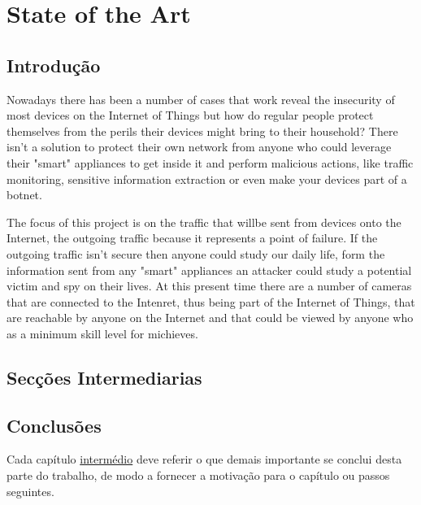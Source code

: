 \chapter{State of the Art}
\label{chap:estado-da-arte}

\section{Introdução}
\label{chap2:sec:intro}
Nowadays there has been a number of cases that work reveal the insecurity of
most devices on the Internet of Things
but how do regular people protect themselves from the perils their devices
might bring to their household? There isn't a solution to protect their own
network from anyone who could leverage their "smart" appliances to get inside
it and perform malicious actions, like traffic monitoring, sensitive
information extraction or even make your devices part of a botnet.

The focus of this project is on the traffic that willbe sent from devices onto
the Internet, the outgoing traffic because it represents a point of failure.
If the outgoing traffic isn't secure then anyone could study our daily life,
form the information sent from any "smart" appliances an attacker could study
a potential victim and spy on their lives. At this present time there are a
number of cameras that are connected to the Intenret, thus being part of the
Internet of Things, that are reachable by anyone on the Internet and that
could be viewed by anyone who as a minimum skill level for michieves.

\section{Secções Intermediarias}
\label{chap2:sec:...}

\section{Conclusões}
\label{chap2:sec:concs}
Cada capítulo \underline{intermédio} deve referir o que demais importante se conclui desta parte do trabalho, de modo a fornecer a motivação para o capítulo ou passos seguintes.
